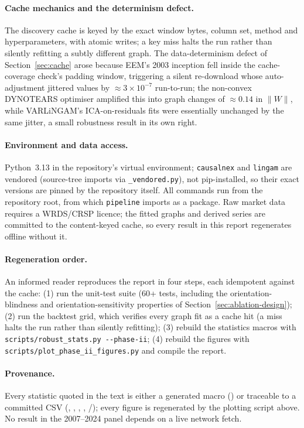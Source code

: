 \paragraph{Cache mechanics and the determinism defect.} The discovery
cache is keyed by the exact window bytes, column set, method and
hyperparameters, with atomic writes; a key miss halts the run rather
than silently refitting a subtly different graph. The data-determinism
defect of Section~\ref{sec:cache} arose because EEM's 2003 inception
fell inside the cache-coverage check's padding window, triggering a
silent re-download whose auto-adjustment jittered values by
${\approx}3\times10^{-7}$ run-to-run; the non-convex DYNOTEARS
optimiser amplified this into graph changes of ${\approx}0.14$ in
$\lVert W\rVert$, while VARLiNGAM's ICA-on-residuals fits were
essentially unchanged by the same jitter, a small robustness result in
its own right.

\paragraph{Environment and data access.} Python~3.13 in the repository's
virtual environment; \texttt{causalnex} and \texttt{lingam} are vendored
(source-tree imports via \texttt{\_vendored.py}), not pip-installed, so
their exact versions are pinned by the repository itself. All commands run
from the repository root, from which \texttt{pipeline} imports as a package.
Raw market data requires a WRDS/CRSP licence; the fitted graphs and derived
series are committed to the content-keyed cache, so every result in this
report regenerates offline without it.

\paragraph{Regeneration order.} An informed reader reproduces the report in
four steps, each idempotent against the cache: (1) run the unit-test suite
(60+ tests, including the orientation-blindness and orientation-sensitivity
properties of Section~\ref{sec:ablation-design}); (2) run the backtest grid,
which verifies every graph fit as a cache hit (a miss halts the run
rather than silently refitting); (3) rebuild the statistics macros with
\texttt{scripts/robust\_stats.py -{}-phase-ii}; (4) rebuild the figures with
\texttt{scripts/plot\_phase\_ii\_figures.py} and compile the report.
\paragraph{Provenance.} Every statistic quoted in the text is either a
generated macro () or traceable to a
committed CSV (,
, ,
,
/); every figure is
regenerated by the plotting script above. No result in the 2007--2024
panel depends on a live network fetch.

